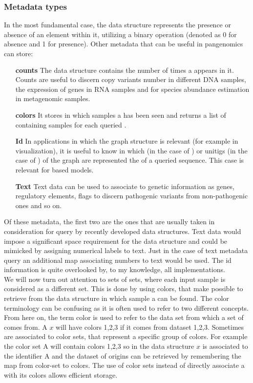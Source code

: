 \subsubsection{Metadata types}
In the most fundamental case, the data structure represents the presence or absence of an element within it, utilizing a binary \memb operation (denoted as 0 for absence and 1 for presence). Other metadata that can be useful in pangenomics can store:
\begin{itemize}
	\item[\textbf{counts}] The data structure contains the number of times a \kmer appears in it. Counts are useful to discern copy variants number in different DNA samples, the expression of genes in RNA samples and for species abundance estimation in metagenomic samples.
	\item[\textbf{colors}] It stores in which samples a \kmer has been seen and returns a list of containing samples for each queried \kmer.
	\item[\textbf{Id}] In applications in which the graph structure is relevant (for example in visualization), it is useful to know in which \kmers (in the case of \dbg) or unitigs (in the case of \cdbg) of the graph are represented the \kmers of a queried sequence. This case is relevant for \dbg based models.
	\item[\textbf{Text}] Text data can be used to associate \kmers to genetic information as genes, regulatory elements, flags to discern pathogenic variants from non-pathogenic ones and so on.
\end{itemize}
Of these metadata, the first two are the ones that are usually taken in consideration for query by recently developed data structures. Text data would impose a significant space requirement for the data structure and could be mimicked by assigning numerical labels to text. Just in the case of text metadata query an additional map associating numbers to text would be used. The id information is quite overlooked by, to my knowledge, all implementations.\\
We will now turn out attention to sets of \kmer sets, where each input sample is considered as a different set. This is done by using colors, that make possible to retrieve from the data structure in which sample a \kmer can be found. The color terminology can be confusing as it is often used to refer to two different concepts. From here on, the term color is used to refer to the data set from which a set of \kmer comes from. A \kmer $x$ will have colors 1,2,3 if it comes from dataset 1,2,3. Sometimes \kmers are associated to color sets, that represent a specific group of colors. For example the color set A will contain colors 1,2,3 so in the data structure \kmer $x$ is associated to the identifier A and the dataset of origins can be retrieved by remembering the map from color-set to colors. The use of color sets instead of directly associate a \kmer with its colors allows efficient storage\cite{ggcat}. 


